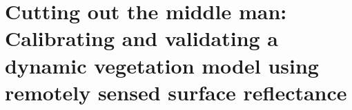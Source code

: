 \chapter{Cutting out the middle man: Calibrating and validating a dynamic vegetation model using remotely sensed surface reflectance}
\thispagestyle{myheadings}

\graphicspath{{4_edr/}}






